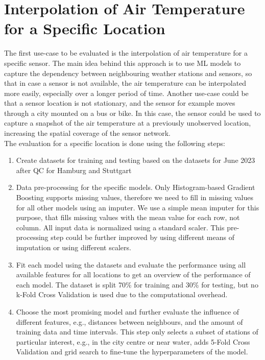 \section{Interpolation of Air Temperature for a Specific Location}

The first use-case to be evaluated is the interpolation of air temperature for a specific sensor. The main idea behind this approach is to use ML models to capture the dependency between neighbouring weather stations and sensors, so that in case a sensor is not available, the air temperature can be interpolated more easily, especially over a longer period of time. Another use-case could be that a sensor location is not stationary, and the sensor for example moves through a city mounted on a bus or bike. In this case, the sensor could be used to capture a snapshot of the air temperature at a previously unobserved location, increasing the spatial coverage of the sensor network.\\
The evaluation for a specific location is done using the following steps:

\begin{enumerate}
  \item Create datasets for training and testing based on the datasets for June 2023 after QC for Hamburg and Stuttgart
  \item Data pre-processing for the specific models. Only Histogram-based Gradient Boosting supports missing values, therefore we need to fill in missing values for all other models using an imputer. We use a simple mean imputer for this purpose, that fills missing values with the mean value for each row, not column. All input data is normalized using a standard scaler. This pre-processing step could be further improved by using different means of imputation or using different scalers.
  \item Fit each model using the datasets and evaluate the performance using all available features for all locations to get an overview of the performance of each model. The dataset is split 70\% for training and 30\% for testing, but no k-Fold Cross Validation is used due to the computational overhead.
  \item Choose the most promising model and further evaluate the influence of different features, e.g., distances between neighbours, and the amount of training data and time intervals. This step only selects a subset of stations of particular interest, e.g., in the city centre or near water, adds 5-Fold Cross Validation and grid search to fine-tune the hyperparameters of the model.
\end{enumerate}

